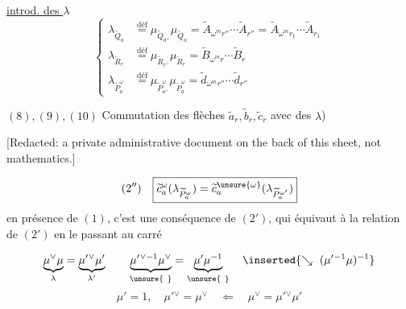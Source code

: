 \uline{introd. des $\lambda$}
\[
\left\{\begin{aligned}
\lambda_{\widetilde Q_a}&\overset{\text{déf}}=\mu_{\widetilde Q_{a^\vee}}\mu_{\widetilde Q_a}
=\widetilde A_{\omega^m r''}\cdots\widetilde A_{r''}
=\widetilde A_{\omega^m r_1}\cdots\widetilde A_{r_1}\\
\lambda_{\widetilde R_r}&\overset{\text{déf}}=\mu_{\widetilde R_{r^\vee}}\mu_{\widetilde R_r}
=\widetilde B_{\omega^m r}\cdots\widetilde B_r\\
\lambda_{\widetilde P_a^\omega}&\overset{\text{déf}}=\mu_{\widetilde P_{a^\vee}^\omega}\mu_{\widetilde P_a^\omega}
=\widetilde d_{\omega^m r''}\cdots\widetilde d_{r''}
\end{aligned}\right.
\]

\quad $(8),(9),(10)$ Commutation des flèches $\widetilde a_r,\widetilde b_r,\widetilde c_r$ avec des $\lambda$)

[Redacted: a private administrative document on the back of this sheet, not mathematics.]

\[
(2'')\quad\boxed{\widetilde c_a^\omega(\lambda_{\widetilde P_a^\omega})
=\widetilde c_a^{\unsure{\omega}}(\lambda_{\widetilde P_a^{\omega'}})}
\]
en présence de $(1)$, c'est une conséquence de $(2')$, qui équivaut à la relation  de $(2')$ en le passant au carré

\[
\underbrace{\mu^\vee\mu}_{\lambda}=\underbrace{\mu'{}^\vee\mu'}_{\lambda'}
\qquad
\underbrace{\mu'{}^{\vee-1}\mu^\vee}_{\unsure{\ }}
=\underbrace{\mu'\mu^{-1}}_{\unsure{\ }}
\quad\inserted{\searrow\ (\mu'{}^{-1}\mu)^{-1}}
\]
\[
\mu'=1,\quad\mu'{}^\vee=\mu^\vee
\quad\Longleftarrow\quad\mu^\vee=\mu'{}^\vee\mu'
\]

